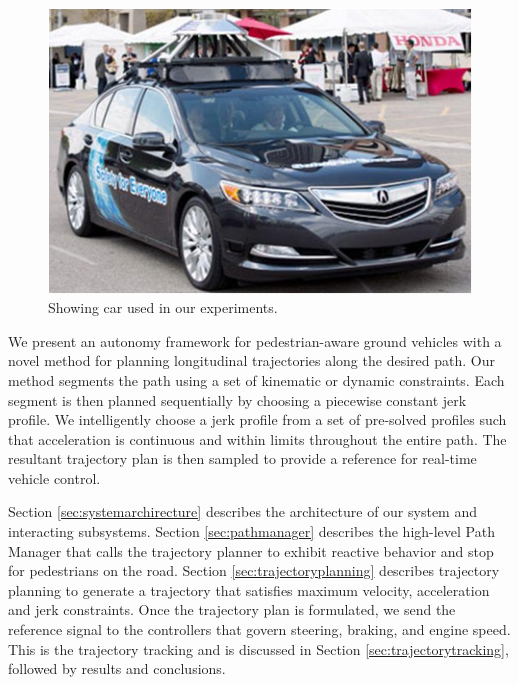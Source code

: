 \documentclass[letterpaper, 10 pt, conference]{ieeeconf}  %
\begin{document}
\begin{figure}[tb]
  \centering
  \includegraphics[width=0.6\columnwidth]{graphics/its_car.png}
  \caption{
    Showing car used in our experiments.
  }
  \label{fig:car}
\end{figure}

We present an autonomy framework for pedestrian-aware ground vehicles
with a novel method for planning longitudinal trajectories 
along the desired path. %
Our method segments the path using a set of kinematic or dynamic constraints.
Each segment is then planned sequentially by choosing a piecewise constant jerk profile.
We intelligently choose a jerk profile from a set of pre-solved profiles such that acceleration is continuous and within limits throughout the entire path.
The resultant trajectory plan is then sampled to provide a reference for real-time vehicle control. %

Section \ref{sec:systemarchirecture} describes the architecture of our system and interacting subsystems.
Section \ref{sec:pathmanager} describes the high-level Path Manager that calls the trajectory planner to 
exhibit reactive behavior and stop for pedestrians on the road.
Section \ref{sec:trajectoryplanning} describes trajectory planning to generate a trajectory that satisfies maximum velocity, acceleration and jerk constraints. 
Once the trajectory plan is formulated, we send the reference signal to the controllers that govern steering, braking, and engine speed.
This is the trajectory tracking and is discussed in Section \ref{sec:trajectorytracking},
followed by results and conclusions.
\end{document}
